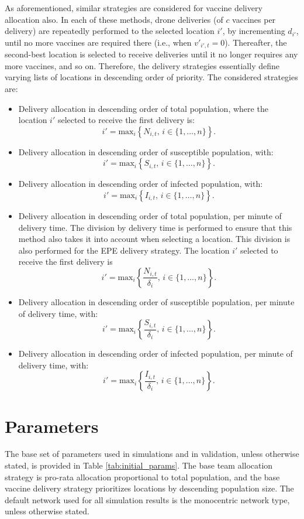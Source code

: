 \documentclass[10pt,letterpaper]{article}
\begin{document}
As aforementioned, similar strategies are considered for vaccine delivery allocation also. In each of these methods, drone deliveries (of $c$ vaccines per delivery) are repeatedly performed to the selected location $i'$, by incrementing $d_{i'}$, until no more vaccines are required there (i.e., when $v'_{i',t} = 0$). Thereafter, the second-best location is selected to receive deliveries until it no longer requires any more vaccines, and so on. Therefore, the delivery strategies essentially define varying lists of locations in descending order of priority. The considered strategies are:
\begin{itemize}
    \item Delivery allocation in descending order of total population, where the location $i'$ selected to receive the first delivery is:
    $$i' = \text{max}_{i}\left\{ N_{i,t}, \, i \in \{1, \dots, n \} \right\}.$$
    \item Delivery allocation in descending order of susceptible population, with:
    $$i' = \text{max}_{i}\left\{ S_{i,t}, \, i \in \{1, \dots, n \} \right\}.$$
    \item Delivery allocation in descending order of infected population, with: 
    $$i' = \text{max}_{i}\left\{ I_{i,t}, \, i \in \{1, \dots, n \} \right\}.$$
    \item Delivery allocation in descending order of total population, per minute of delivery time. The division by delivery time is performed to ensure that this method also takes it into account when selecting a location. This division is also performed for the EPE delivery strategy. The location $i'$ selected to receive the first delivery is 
    $$i' = \text{max}_{i}\left\{ \frac{N_{i,t}}{\delta_{i}}, \, i \in \{1, \dots, n \} \right\}.$$
    \item Delivery allocation in descending order of susceptible population, per minute of delivery time, with:
    $$i' = \text{max}_{i}\left\{ \frac{S_{i,t}}{\delta_{i}}, \, i \in \{1, \dots, n \} \right\}.$$
    \item Delivery allocation in descending order of infected population, per minute of delivery time, with:
    $$i' = \text{max}_{i}\left\{ \frac{I_{i,t}}{\delta_{i}}, \, i \in \{1, \dots, n \} \right\}.$$
\end{itemize}

\section*{Parameters}
The base set of parameters used in simulations and in validation, unless otherwise stated, is provided in Table \ref{tab:initial_params}. The base team allocation strategy is pro-rata allocation proportional to total population, and the base vaccine delivery strategy prioritizes locations by descending population size. The default network used for all simulation results is the monocentric network type, unless otherwise stated.
\end{document}

